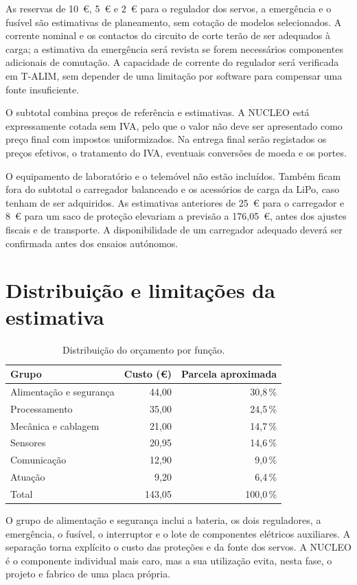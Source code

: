 As reservas de 10~€, 5~€ e 2~€ para o regulador dos servos, a emergência e o fusível são estimativas de planeamento, sem cotação de modelos selecionados. A corrente nominal e os contactos do circuito de corte terão de ser adequados à carga; a estimativa da emergência será revista se forem necessários componentes adicionais de comutação. A capacidade de corrente do regulador será verificada em T-ALIM, sem depender de uma limitação por software para compensar uma fonte insuficiente.

O subtotal combina preços de referência e estimativas. A NUCLEO está expressamente cotada sem IVA, pelo que o valor não deve ser apresentado como preço final com impostos uniformizados. Na entrega final serão registados os preços efetivos, o tratamento do IVA, eventuais conversões de moeda e os portes.

O equipamento de laboratório e o telemóvel não estão incluídos. Também ficam fora do subtotal o carregador balanceado e os acessórios de carga da LiPo, caso tenham de ser adquiridos. As estimativas anteriores de 25~€ para o carregador e 8~€ para um saco de proteção elevariam a previsão a 176,05~€, antes dos ajustes fiscais e de transporte. A disponibilidade de um carregador adequado deverá ser confirmada antes dos ensaios autónomos.

\section{Distribuição e limitações da estimativa}
\begin{table}[H]
\centering\small
\caption{Distribuição do orçamento por função.}
\begin{tabularx}{\textwidth}{Yrr}
\toprule
Grupo & Custo (€) & Parcela aproximada\\\midrule
Alimentação e segurança & 44,00 & 30,8\,\%\\
Processamento & 35,00 & 24,5\,\%\\
Mecânica e cablagem & 21,00 & 14,7\,\%\\
Sensores & 20,95 & 14,6\,\%\\
Comunicação & 12,90 & 9,0\,\%\\
Atuação & 9,20 & 6,4\,\%\\
\midrule
Total & 143,05 & 100,0\,\%\\
\bottomrule
\end{tabularx}
\label{tab:grupos-custos}
\end{table}

O grupo de alimentação e segurança inclui a bateria, os dois reguladores, a emergência, o fusível, o interruptor e o lote de componentes elétricos auxiliares. A separação torna explícito o custo das proteções e da fonte dos servos. A NUCLEO é o componente individual mais caro, mas a sua utilização evita, nesta fase, o projeto e fabrico de uma placa própria.

